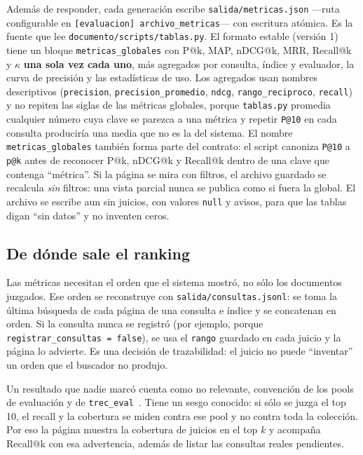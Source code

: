 \documentclass[11pt,spanish]{article}
\begin{document}
Además de responder, cada generación escribe \texttt{salida/metricas.json}
---ruta configurable en \texttt{[evaluacion] archivo\_metricas}--- con escritura
atómica. Es la fuente que lee \texttt{documento/scripts/tablas.py}. El formato
estable (versión 1) tiene un bloque \texttt{metricas\_globales} con P@k, MAP,
nDCG@k, MRR, Recall@k y $\kappa$ \textbf{una sola vez cada uno}, más agregados
por consulta, índice y evaluador, la curva de precisión y las estadísticas de
uso. Los agregados usan nombres descriptivos (\texttt{precision},
\texttt{precision\_promedio}, \texttt{ndcg}, \texttt{rango\_reciproco},
\texttt{recall}) y no repiten las siglas de las métricas globales, porque
\texttt{tablas.py} promedia cualquier número cuya clave se parezca a una
métrica y repetir \texttt{P@10} en cada consulta produciría una media que no
es la del sistema. El nombre \texttt{metricas\_globales} también forma parte del
contrato: el script canoniza \texttt{P@10} a \texttt{p@k} antes de reconocer
P@k, nDCG@k y Recall@k dentro de una clave que contenga ``métrica''. Si la
página se mira con filtros, el archivo guardado se recalcula \emph{sin}
filtros: una vista parcial nunca se publica como si fuera la global. El archivo
se escribe aun sin juicios, con valores \texttt{null} y avisos, para que las
tablas digan ``sin datos'' y no inventen ceros.

\subsection{De dónde sale el ranking}
\label{sec:ranking-metricas}

Las métricas necesitan el orden que el sistema mostró, no sólo los documentos
juzgados. Ese orden se reconstruye con \texttt{salida/consultas.jsonl}: se toma
la última búsqueda de cada página de una consulta e índice y se concatenan en
orden. Si la consulta nunca se registró (por ejemplo, porque
\texttt{registrar\_consultas = false}), se usa el \texttt{rango} guardado en
cada juicio y la página lo advierte. Es una decisión de trazabilidad: el juicio
no puede ``inventar'' un orden que el buscador no produjo.

Un resultado que nadie marcó cuenta como no relevante, convención de los pools
de evaluación y de \texttt{trec\_eval}~\cite{buckley2004}. Tiene un sesgo
conocido: si sólo se juzga el top 10, el recall y la cobertura se miden contra
ese pool y no contra toda la colección. Por eso la página muestra la cobertura
de juicios en el top $k$ y acompaña Recall@k con esa advertencia, además de
listar las consultas reales pendientes.
\end{document}
